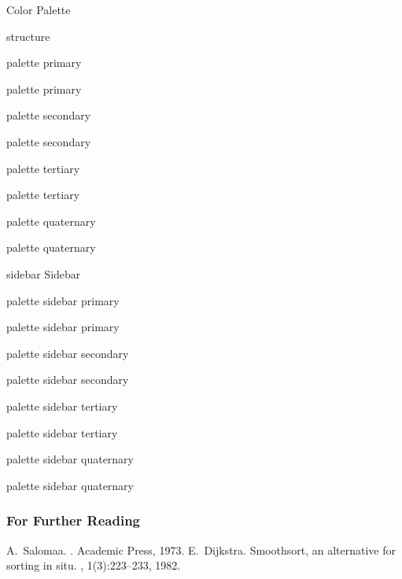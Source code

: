 \documentclass[titlebar,fancyfoot,11pt]{khbeamer}
\begin{document}
\begin{frame}{Color Palette}

\textcolor{structure}{structure}

\begin{minipage}{10em}
	\begin{beamercolorbox}{palette primary}
	\strut palette primary
	\end{beamercolorbox}

	\begin{beamercolorbox}{palette secondary}
	\strut palette secondary
	\end{beamercolorbox}

	\begin{beamercolorbox}{palette tertiary}
	\strut palette tertiary
	\end{beamercolorbox}

	\begin{beamercolorbox}{palette quaternary}
	\strut palette quaternary
	\end{beamercolorbox}
\end{minipage}

\begin{minipage}{12em}
\small
\begin{beamercolorbox}{sidebar}
	Sidebar

	\begin{beamercolorbox}{palette sidebar primary}
	\strut palette sidebar primary
	\end{beamercolorbox}

	\begin{beamercolorbox}{palette sidebar secondary}
	\strut palette sidebar secondary
	\end{beamercolorbox}

	\begin{beamercolorbox}{palette sidebar tertiary}
	\strut palette sidebar tertiary
	\end{beamercolorbox}

	\begin{beamercolorbox}{palette sidebar quaternary}
	\strut palette sidebar quaternary
	\end{beamercolorbox}
\end{beamercolorbox}
\end{minipage}
\end{frame}


\begin{frame}
\frametitle{For Further Reading}
\begin{thebibliography}{Dijkstra, 1982}
A.~Salomaa.
.
\newblock Academic Press, 1973.
E.~Dijkstra.
\newblock Smoothsort, an alternative for sorting in situ.
, 1(3):223--233, 1982.
\end{thebibliography}
\end{frame}
\end{document}
